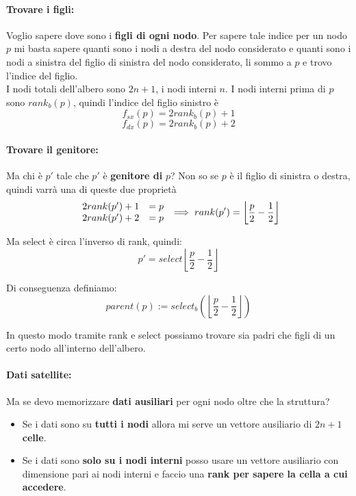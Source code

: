 \paragraph{Trovare i figli:} Voglio sapere dove sono i \textbf{figli di ogni nodo}. Per sapere tale indice per un nodo $p$ mi basta sapere quanti sono i nodi a destra del nodo considerato e quanti sono i nodi a sinistra del figlio di sinistra del nodo considerato, li sommo a $p$ e trovo l'indice del figlio.\\

I nodi totali dell'albero sono $2n+1$, i nodi interni $n$. I nodi interni prima di $p$ sono $ rank_b (p)$, quindi l'indice del figlio sinistro è 
$$ f_{sx} (p) = 2 rank_b (p) + 1 $$
$$ f_{dx} (p) = 2 rank_b (p) + 2 $$

\newpage

\paragraph{Trovare il genitore:} Ma chi è $p'$ tale che $p'$ è \textbf{genitore di} $p$? Non so se $p$ è il figlio di sinistra o destra, quindi varrà una di queste due proprietà
$$
\begin{array}{c c}
	2 rank (p') + 1 & = p \\
	2 rank (p') + 2 & = p
\end{array}
\implies rank (p') = \left\lfloor \frac{p}{2} - \frac{1}{2} \right\rfloor $$

Ma select è circa l'inverso di rank, quindi: 
$$
p' = select \left\lfloor \frac{p}{2} - \frac{1}{2} \right\rfloor
$$

Di conseguenza definiamo:
$$ parent(p) := select_b \left(\left\lfloor \frac{p}{2} - \frac{1}{2} \right\rfloor\right) $$

In questo modo tramite rank e select possiamo trovare sia padri che figli di un certo nodo all'interno dell'albero.\\

\paragraph{Dati satellite:} Ma se devo memorizzare \textbf{dati ausiliari} per ogni nodo oltre che la struttura?
\begin{itemize}
	\item Se i dati sono su \textbf{tutti i nodi} allora mi serve un vettore ausiliario di $2n+1$ \textbf{celle}.\\
	
	\item Se i dati sono \textbf{solo su i nodi interni} posso usare un vettore ausiliario con dimensione pari ai nodi interni e faccio una \textbf{rank per sapere la cella a cui accedere}.\\
\end{itemize}


